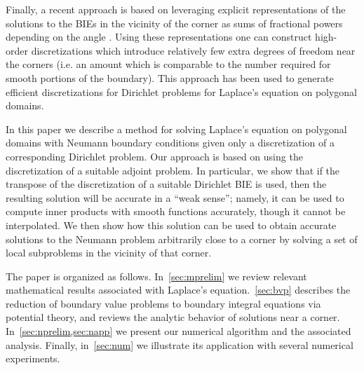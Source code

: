  Finally, a recent approach is based on leveraging explicit representations of the solutions to the BIEs in the vicinity of the corner as sums of fractional powers depending on the angle \cite{serkhacha}. Using these representations one can construct high-order discretizations which introduce relatively few extra degrees of freedom near the corners (i.e. an amount which is comparable to the number required for smooth portions of the boundary). This approach has been used to generate efficient discretizations for Dirichlet problems for Laplace's equation on polygonal domains\cite{hoskins2019numerical}. 
 
 In this paper we describe a method for solving Laplace's equation on polygonal domains with Neumann boundary conditions given only a discretization of a corresponding Dirichlet problem. Our approach is based on using the discretization of a suitable adjoint problem. In particular, we show that if the transpose of the discretization of a suitable Dirichlet BIE is used, then the resulting solution will be accurate in a ``weak sense''; namely, it can be used to compute inner products with smooth functions accurately, though it cannot be interpolated. We then show how this solution can be used to obtain accurate solutions to the Neumann problem arbitrarily close to a corner by solving a set of local subproblems in the vicinity of that corner.
 
 The paper is organized as follows. In~\cref{sec:mprelim} we review relevant mathematical results associated with Laplace's equation.~\cref{sec:bvp} describes the reduction of boundary value problems to boundary integral equations via potential theory, and reviews the analytic behavior of solutions near a corner. In~\cref{sec:nprelim,sec:napp} we present our numerical algorithm and the associated analysis. Finally, in~\cref{sec:num} we illustrate its application with several numerical experiments.